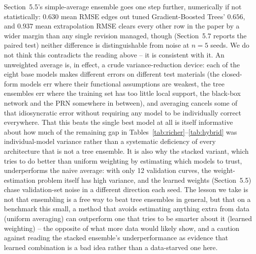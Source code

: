 \documentclass[11pt]{article}
\begin{document}
Section~5.5's simple-average ensemble goes one step further, numerically if not statistically: $0.630$ mean RMSE edges out tuned Gradient-Boosted Trees' $0.656$, and $0.937$ mean extrapolation RMSE clears every other row in the paper by a wider margin than any single revision managed, though (Section~5.7 reports the paired test) neither difference is distinguishable from noise at $n=5$ seeds. We do not think this contradicts the reading above -- it is consistent with it. An unweighted average is, in effect, a crude variance-reduction device: each of the eight base models makes different errors on different test materials (the closed-form models err where their functional assumptions are weakest, the tree ensembles err where the training set has too little local support, the black-box network and the PRN somewhere in between), and averaging cancels some of that idiosyncratic error without requiring any model to be individually correct everywhere. That this beats the single best model at all is itself informative about how much of the remaining gap in Tables~\ref{tab:richer}--\ref{tab:hybrid} was individual-model variance rather than a systematic deficiency of every architecture that is not a tree ensemble. It is also why the stacked variant, which tries to do better than uniform weighting by estimating which models to trust, underperforms the naive average: with only 12 validation curves, the weight-estimation problem itself has high variance, and the learned weights (Section~5.5) chase validation-set noise in a different direction each seed. The lesson we take is not that ensembling is a free way to beat tree ensembles in general, but that on a benchmark this small, a method that avoids estimating anything extra from data (uniform averaging) can outperform one that tries to be smarter about it (learned weighting) -- the opposite of what more data would likely show, and a caution against reading the stacked ensemble's underperformance as evidence that learned combination is a bad idea rather than a data-starved one here.
\end{document}
